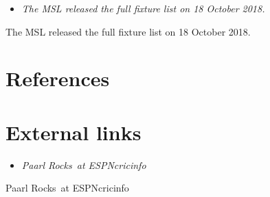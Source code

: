 \begin{itemize}
\item
  \emph{The MSL released the full fixture list on 18 October 2018.}
\end{itemize}

The MSL released the full fixture list on 18 October 2018.

\section{References}\label{references}

\section{External links}\label{external-links}

\begin{itemize}
\item
  \emph{Paarl Rocks~at ESPNcricinfo}
\end{itemize}

Paarl Rocks~at ESPNcricinfo
